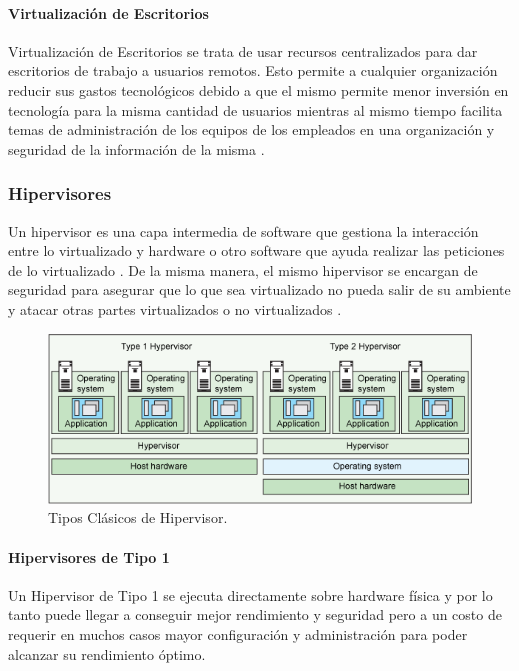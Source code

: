 \paragraph{Virtualización de Escritorios}
Virtualización de Escritorios se trata de usar recursos centralizados para dar escritorios de trabajo a usuarios remotos. Esto permite a cualquier organización reducir sus gastos tecnológicos debido a que el mismo permite menor inversión en tecnología para la misma cantidad de usuarios mientras al mismo tiempo facilita temas de administración de los equipos de los empleados en una organización y seguridad de la información de la misma \citep{VMWare-Virtualization}.

\subsubsection{Hipervisores}
Un hipervisor es una capa intermedia de software que gestiona la interacción entre lo virtualizado y hardware o otro software que ayuda realizar las peticiones de lo virtualizado \citep{VMWare-Virtualization}. De la misma manera, el mismo hipervisor se encargan de seguridad para asegurar que lo que sea virtualizado no pueda salir de su ambiente y atacar otras partes virtualizados o no virtualizados \citep{VMWare-HypervisorSecurity} \citep{IBM-KVM-Security}.

\begin{figure}
  \begin{center}
      \includegraphics[width=\textwidth]{Figures/ibm-hypervisortypes.png}
  \end{center}
  \caption{Tipos Clásicos de Hipervisor.} 
  \label{IBM-HypervisorTypes}
\end{figure}

\paragraph{Hipervisores de Tipo 1}
Un Hipervisor de Tipo 1 se ejecuta directamente sobre hardware física \citep{IBM-Hypervisors} y por lo tanto puede llegar a conseguir mejor rendimiento y seguridad pero a un costo de requerir en muchos casos mayor configuración y administración para poder alcanzar su rendimiento óptimo.

